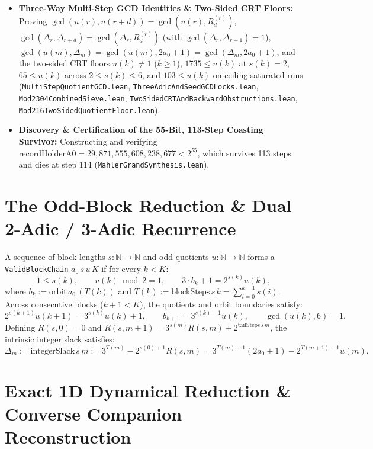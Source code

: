 \documentclass[11pt]{article}
\begin{document}
\begin{itemize}
  \item \textbf{Three-Way Multi-Step GCD Identities \& Two-Sided CRT Floors:} Proving $\gcd(u(r), u(r+d)) = \gcd(u(r), R^{(r)}_d)$, $\gcd(\Delta_r, \Delta_{r+d}) = \gcd(\Delta_r, R^{(r)}_d)$ (with $\gcd(\Delta_r, \Delta_{r+1}) = 1$), $\gcd(u(m), \Delta_m) = \gcd(u(m), 2a_0+1) = \gcd(\Delta_m, 2a_0+1)$, and the two-sided CRT floors $u(k) \ne 1$ ($k \ge 1$), $1735 \le u(k)$ at $s(k) = 2$, $65 \le u(k)$ across $2 \le s(k) \le 6$, and $103 \le u(k)$ on ceiling-saturated runs (\texttt{MultiStepQuotientGCD.lean}, \texttt{ThreeAdicAndSeedGCDLocks.lean}, \texttt{Mod2304CombinedSieve.lean}, \texttt{TwoSidedCRTAndBackwardObstructions.lean}, \texttt{Mod216TwoSidedQuotientFloor.lean}).
  \item \textbf{Discovery \& Certification of the 55-Bit, 113-Step Coasting Survivor:} Constructing and verifying $\mathrm{recordHolderA0} = 29{,}871{,}555{,}608{,}238{,}677 < 2^{55}$, which survives 113 steps and dies at step 114 (\texttt{MahlerGrandSynthesis.lean}).
\end{itemize}

\section{The Odd-Block Reduction \& Dual 2-Adic / 3-Adic Recurrence}

A sequence of block lengths $s : \mathbb{N} \to \mathbb{N}$ and odd quotients $u : \mathbb{N} \to \mathbb{N}$ forms a \texttt{ValidBlockChain} $a_0\, s\, u\, K$ if for every $k < K$:
\[
  1 \le s(k), \qquad u(k) \bmod 2 = 1, \qquad 3 \cdot b_k + 1 = 2^{s(k)} u(k),
\]
where $b_k := \mathrm{orbit}\, a_0\, (T(k))$ and $T(k) := \mathrm{blockSteps}\, s\, k = \sum_{i=0}^{k-1} s(i)$. Across consecutive blocks ($k + 1 < K$), the quotients and orbit boundaries satisfy:
\[
  2^{s(k+1)} u(k+1) = 3^{s(k)} u(k) + 1, \qquad b_{k+1} = 3^{s(k)-1} u(k), \qquad \gcd(u(k), 6) = 1.
\]
Defining $R(s, 0) = 0$ and $R(s, m+1) = 3^{s(m)} R(s, m) + 2^{\mathrm{tailSteps}\, s\, m}$, the intrinsic integer slack satisfies:
\[
  \Delta_m := \mathrm{integerSlack}\, s\, m := 3^{T(m)} - 2^{s(0)+1} R(s, m) = 3^{T(m)+1}(2a_0 + 1) - 2^{T(m+1)+1} u(m).
\]

\section{Exact 1D Dynamical Reduction \& Converse Companion Reconstruction}
\end{document}

